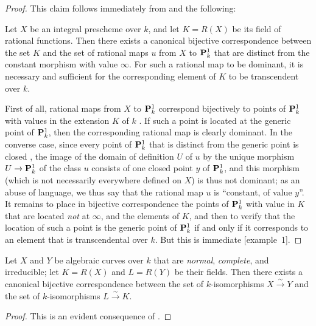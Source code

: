\begin{proof}
This claim follows immediately from  and the following:
\begin{lemma}
\label{II.7.4.15.1}
Let $X$ be an integral prescheme over $k$, and let $K=R(X)$ be its field of rational functions.
Then there exists a canonical bijective correspondence between the set $K$ and the set of rational maps $u$ from $X$ to $\mathbf{P}_k^1$ that are distinct from the constant morphism with value $\infty$.
For such a rational map to be dominant, it is necessary and sufficient for the corresponding element of $K$ to be transcendent over $k$.
\end{lemma}
First of all, rational maps from $X$ to $\mathbf{P}_k^1$ correspond bijectively to points of $\mathbf{P}_k^1$ with values in the extension $K$ of $k$ .
If such a point is located  at the generic point of $\mathbf{P}_k^1$, then the corresponding rational map is clearly dominant.
In the converse case, since every point of $\mathbf{P}_k^1$ that is distinct from the generic point is closed , the image of the domain of definition $U$ of $u$ by the unique morphism $U\to\bb{P}_k^1$ of the class $u$  consists of one closed point $y$ of $\mathbf{P}_k^1$, and this morphism (which is not necessarily everywhere defined on $X$) is thus not dominant;
as an abuse of language, we thus say that the rational map $u$ is ``constant, of value $y$''.
It remains to place in bijective correspondence the points of $\mathbf{P}_k^1$ with value in $K$ that are located  \emph{not} at $\infty$, and the elements of $K$, and then to verify that the location of such a point is the generic point of $\mathbf{P}_k^1$ if and only if it corresponds to an
element that is transcendental over $k$.
But this is immediate [example~1].
\end{proof}

\begin{corollary}[7.4.16]
\label{II.7.4.16}
Let $X$ and $Y$ be algebraic curves over $k$ that are \emph{normal}, \emph{complete}, and irreducible;
let $K=R(X)$ and $L=R(Y)$ be their fields.
Then there exists a canonical bijective correspondence between the set of $k$-isomorphisms $X\xrightarrow{\sim}Y$ and the set of $k$-isomorphisms $L\xrightarrow{\sim}K$.
\end{corollary}

\begin{proof}
This is an evident consequence of .
\end{proof}

